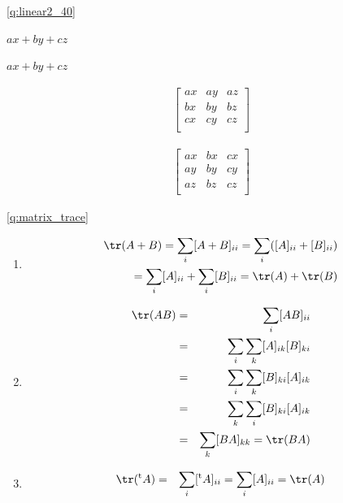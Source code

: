 \ref{q:linear2_40}　
\begin{edaenumerate}
\item $ax+by+cz$
\item $ax+by+cz$
\item 
\begin{eqnarray*}
\begin{bmatrix}
ax  &  ay &  az\\
bx  &  by &  bz\\
cx  &  cy &  cz\\
\end{bmatrix}
\end{eqnarray*}
\item 
\begin{eqnarray*}
\begin{bmatrix}
ax  &  bx &  cx\\
ay  &  by &  cy\\
az  &  bz &  cz\\
\end{bmatrix}
\end{eqnarray*}
\end{edaenumerate}
\vspace{0.2cm}




\ref{q:matrix_trace}　\\
\begin{enumerate}
\item
\begin{eqnarray*}
\tr(A+B)=\sum_{i} [A+B]_{ii}=\sum_{i}([A]_{ii}+[B]_{ii})\\
=\sum_{i}[A]_{ii}+\sum_{i}[B]_{ii}=\tr(A)+\tr(B)
\end{eqnarray*}
\item
\begin{eqnarray*}
\tr(AB)&=&\sum_{i}[AB]_{ii}\\
&=&\sum_{i}\sum_{k}[A]_{ik}[B]_{ki}\\
&=&\sum_{i}\sum_{k}[B]_{ki}[A]_{ik}\\
&=&\sum_{k}\sum_{i}[B]_{ki}[A]_{ik}\\
&=&\sum_{k}[BA]_{kk}=\tr(BA)
\end{eqnarray*}
\item
\begin{eqnarray*}
\tr(^{\text t}A)&=&\sum_{i}[^{\text t}A]_{ii}=\sum_{i}[A]_{ii}=\tr(A)
\end{eqnarray*}
\end{enumerate}
\vv

